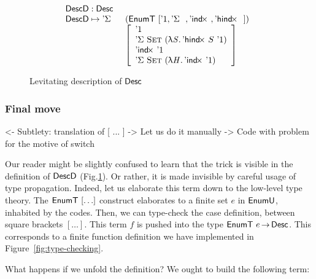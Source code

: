 \begin{figure}

\[\stk{
\DescD : \Desc \\
\begin{array}{@{}ll}
\DescD \mapsto \DSigma{}{} & (\EnumT [ \DUnit, \DSigma{}{}, \DIndx{}, \DHindx{}{} ]) \\
                           & \left[\begin{array}{l}
                                   \DUnit                                            \\
                                   \DSigma{\Set}{(\LAM{\V{S}} \DHindx{S}{\DUnit})}   \\
                                   \DIndx{\DUnit}                                    \\
                                   \DSigma{\Set}{(\LAM{\V{H}} \DIndx{\DUnit})}
                                   \end{array}
                             \right]
\end{array}
}\]

\caption{Levitating description of $\Desc$}
\label{fig:desc-levitate}

\end{figure}

\subsubsection{Final move}

\begin{wstructure}
<- Subtlety: translation of [ ... ]
    -> Let us do it manually
        -> Code with problem for the motive of switch
\end{wstructure}

Our reader might be slightly confused to learn that the trick is
visible in the definition of $\DescD$
(Fig.\ref{fig:desc-levitate}). Or rather, it is made invisible by
careful usage of type propagation. Indeed, let us elaborate this term
down to the low-level type theory. The $\EnumT [ \ldots ]$ construct
elaborates to a finite set $e$ in $\EnumU$, inhabited by the
codes. Then, we can type-check the case definition, between square
brackets $[ \ldots ]$. This term $f$ is pushed into the type
$\EnumT{e} \To \Desc$. This corresponds to a finite function
definition we have implemented in Figure~\ref{fig:type-checking}.

What happens if we unfold the definition? We ought to build the following term:

